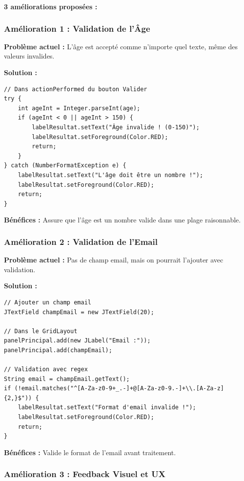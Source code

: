 \documentclass[11pt,a4paper]{article}
\begin{document}
\begin{correctionbox}
\textbf{3 améliorations proposées :}

\subsubsection{Amélioration 1 : Validation de l'Âge}

\textbf{Problème actuel :} L'âge est accepté comme n'importe quel texte, même des valeurs invalides.

\textbf{Solution :}
\begin{lstlisting}
// Dans actionPerformed du bouton Valider
try {
    int ageInt = Integer.parseInt(age);
    if (ageInt < 0 || ageInt > 150) {
        labelResultat.setText("Âge invalide ! (0-150)");
        labelResultat.setForeground(Color.RED);
        return;
    }
} catch (NumberFormatException e) {
    labelResultat.setText("L'âge doit être un nombre !");
    labelResultat.setForeground(Color.RED);
    return;
}
\end{lstlisting}

\textbf{Bénéfices :} Assure que l'âge est un nombre valide dans une plage raisonnable.

\subsubsection{Amélioration 2 : Validation de l'Email}

\textbf{Problème actuel :} Pas de champ email, mais on pourrait l'ajouter avec validation.

\textbf{Solution :}
\begin{lstlisting}
// Ajouter un champ email
JTextField champEmail = new JTextField(20);

// Dans le GridLayout
panelPrincipal.add(new JLabel("Email :"));
panelPrincipal.add(champEmail);

// Validation avec regex
String email = champEmail.getText();
if (!email.matches("^[A-Za-z0-9+_.-]+@[A-Za-z0-9.-]+\\.[A-Za-z]{2,}$")) {
    labelResultat.setText("Format d'email invalide !");
    labelResultat.setForeground(Color.RED);
    return;
}
\end{lstlisting}

\textbf{Bénéfices :} Valide le format de l'email avant traitement.

\subsubsection{Amélioration 3 : Feedback Visuel et UX}


\end{correctionbox}
\end{document}
